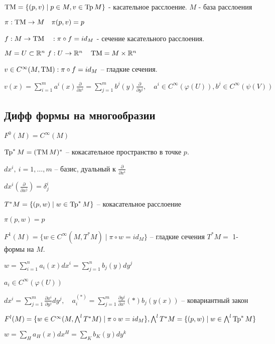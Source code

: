     $\operatorname{TM} = \{ (p, v) \mid p \in M, v \in \operatorname{Tp} M\}$ - касательное расслоение.
    $M$ - база расслоения

    $\pi : \operatorname{TM} \to M \quad \pi(p,v) = p$

    \begin{definition}
      $f: M \to \operatorname{TM} \quad : \pi \circ f = id_M$ - сечение касательного расслоения.

      $M = U \subset \mathbb{R}^n \ f: U \to \mathbb{R}^n \quad \operatorname{TM} = M \times \mathbb{R}^n$
    \end{definition}

    \begin{definition}
      $v \in C^\infty(M, \operatorname{TM}) : \pi \circ f = id_M $ -- гладкие сечения.

      $v(x) = \sum^m_{i=1}a^i(x)\frac{\partial}{\partial x^i} = \sum^m_{j=1} b^j(y)\frac{\partial}{\partial y^j}, \quad a^i \in C^\infty(\varphi(U)), b^j \in C^\infty(\psi(V))$
    \end{definition}
    

  \subsection*{Дифф формы на многообразии}

  $F^0(M) = C^\infty(M)$

  $\operatorname{Tp}^*M = (\operatorname{TM} M)^*$ -- кокасательное пространство в точке $p$.

  $dx^i, \ i=1,\dotsc, m$ -- базис, дуальный к $\frac{\partial}{\partial x^i}$

  $dx^i(\frac{\partial}{\partial x^j}) = \delta^i_j$

  $T^*M = \{ (p, w) \mid w \in \operatorname{Tp}^*M \}$ -- кокасательное расслоение

  $\pi(p,w) = p$

  $F^1(M) = \{w \in C^\infty(M, T^*M)  \mid \pi \circ w = id_M\}$ -- гладкие сечения $T^*M =$ 1-формы на $M$.

  $w = \sum^n_{i=1}a_i(x)dx^i = \sum^n_{j=1}b_j(y)dy^j$

  $a_i \in C^\infty(\varphi(U))$

  $dx^i = \sum^m_{j=1} \frac{\partial x^i}{\partial y^j}dy^j, \quad a_i^{(*)} = \sum^m_{j=1}\frac{\partial y^j}{\partial x^i}(*)b_j(y(x))$ -- ковариантный закон

  $F^l(M) = \{ w \in C^\infty(M, \bigwedge^l T^*M) \mid \pi \circ w = id_M\}, \bigwedge^lT^*M = \{(p,w) \mid w \in \bigwedge^l \operatorname{Tp}^*M\}$

  $w = \sum_H a_H(x)dx^H = \sum_K b_K(y)dy^k$

